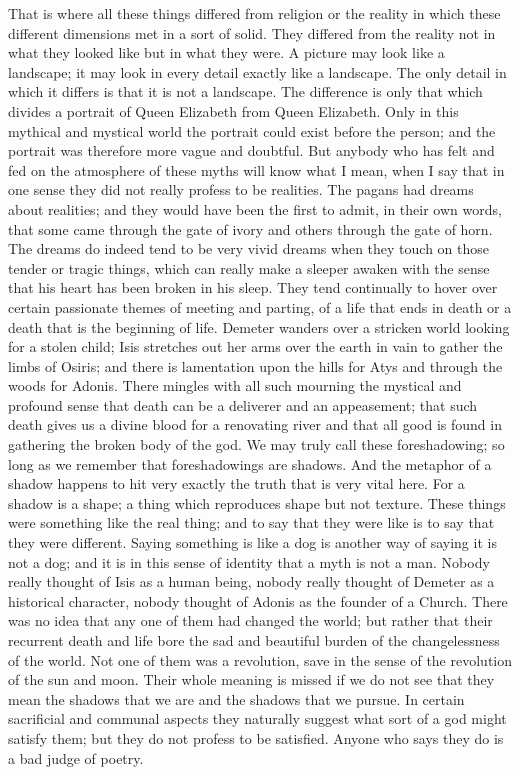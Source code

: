 That is where all these things differed from religion or the reality in which these different dimensions met in a sort of solid. They differed from the reality not in what they looked like but in what they were. A picture may look like a landscape; it may look in every detail exactly like a landscape. The only detail in which it differs is that it is not a landscape. The difference is only that which divides a portrait of Queen Elizabeth from Queen Elizabeth. Only in this mythical and mystical world the portrait could exist before the person; and the portrait was therefore more vague and doubtful. But anybody who has felt and fed on the atmosphere of these myths will know what I mean, when I say that in one sense they did not really profess to be realities. The pagans had dreams about realities; and they would have been the first to admit, in their own words, that some came through the gate of ivory and others through the gate of horn. The dreams do indeed tend to be very vivid dreams when they touch on those tender or tragic things, which can really make a sleeper awaken with the sense that his heart has been broken in his sleep. They tend continually to hover over certain passionate themes of meeting and parting, of a life that ends in death or a death that is the beginning of life. Demeter wanders over a stricken world looking for a stolen child; Isis stretches out her arms over the earth in vain to gather the limbs of Osiris; and there is lamentation upon the hills for Atys and through the woods for Adonis. There mingles with all such mourning the mystical and profound sense that death can be a deliverer and an appeasement; that such death gives us a divine blood for a renovating river and that all good is found in gathering the broken body of the god. We may truly call these foreshadowing; so long as we remember that foreshadowings are shadows. And the metaphor of a shadow happens to hit very exactly the truth that is very vital here. For a shadow is a shape; a thing which reproduces shape but not texture. These things were something like the real thing; and to say that they were like is to say that they were different. Saying something is like a dog is another way of saying it is not a dog; and it is in this sense of identity that a myth is not a man. Nobody really thought of Isis as a human being, nobody really thought of Demeter as a historical character, nobody thought of Adonis as the founder of a Church. There was no idea that any one of them had changed the world; but rather that their recurrent death and life bore the sad and beautiful burden of the changelessness of the world. Not one of them was a revolution, save in the sense of the revolution of the sun and moon. Their whole meaning is missed if we do not see that they mean the shadows that we are and the shadows that we pursue. In certain sacrificial and communal aspects they naturally suggest what sort of a god might satisfy them; but they do not profess to be satisfied. Anyone who says they do is a bad judge of poetry.

